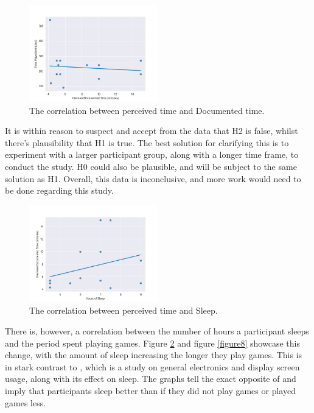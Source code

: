 \documentclass[conference]{IEEEtran}
\begin{document}
\begin{figure}[H]
\includegraphics[width = 0.5\textwidth]{Graph1}
\caption{The correlation between perceived time and Documented time.}
\label{figure6}
\end{figure}

It is within reason to suspect and accept from the data that H2 is false, whilst there’s plausibility that H1 is true. The best solution for clarifying this is to experiment with a larger participant group, along with a longer time frame, to conduct the study. H0 could also be plausible, and will be subject to the same solution as H1. Overall, this data is inconclusive, and more work would need to be done regarding this study.

\begin{figure}[H]
\includegraphics[width = 0.5\textwidth]{Graph2}
\caption{The correlation between perceived time and Sleep.}
\label{figure7}
\end{figure}

There is, however, a correlation between the number of hours a participant sleeps and the period spent playing games. Figure \ref{figure7} and figure \ref{figure8} showcase this change, with the amount of sleep increasing the longer they play games. This is in stark contrast to \cite{Yamazaki2022}, which is a study on general electronics and display screen usage, along with its effect on sleep. The graphs tell the exact opposite of \cite{Yamazaki2022} and imply that participants sleep better than if they did not play games or played games less.
\end{document}
